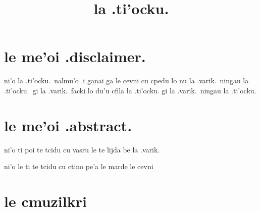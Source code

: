 \documentclass{report}
\title{la .ti'ocku.}
\begin{document}
\maketitle

\chapter{le me'oi .disclaimer.}
ni'o la .ti'ocku.\ nalmu'o  .i ganai ga le cevni cu cpedu lo nu la .varik.\ ningau la .ti'ocku.\ gi la .varik.\ facki lo du'u cfila la .ti'ocku. gi la .varik.\ ningau la .ti'ocku.

\chapter{le me'oi .abstract.}
ni'o ti poi te tcidu cu vasru le te lijda be la .varik.

ni'o le ti te tcidu cu ctino pe'a le marde le cevni

\chapter{le cmuzilkri}
\end{document}
